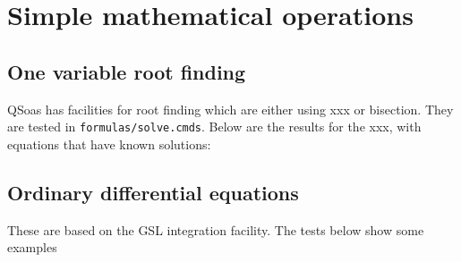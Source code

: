 \documentclass{article}
\newcommand{\QSoas}{\texttt{QSoas}}
\begin{document}
\begin{abstract}
  This document contains a number of computations used in the more
  computational part of the tests. It serves both as a reminder of the
  rationale behind the tests and as a means to compute the results and
  verify them.
\end{abstract}

\listoftodos


\section{Simple mathematical operations}

\subsection{One variable root finding}

QSoas has facilities for root finding which are either using xxx or
bisection. They are tested in \texttt{formulas/solve.cmds}. Below are
the results for the xxx, with equations that have known solutions:

\begin{testresult}
  \begin{center}
  \end{center}
  \caption{Results of the tests for \texttt{solve} in
    \texttt{formulas/solve.cmds}}
\end{testresult}

\subsection{Ordinary differential equations}

These are based on the GSL integration facility. The tests below show
some examples

\begin{testresult}
  \begin{center}
  \end{center}
  \caption{Results of the tests for the command \texttt{ode} in
    \texttt{odes/series.cmds}}
\end{testresult}
\end{document}
